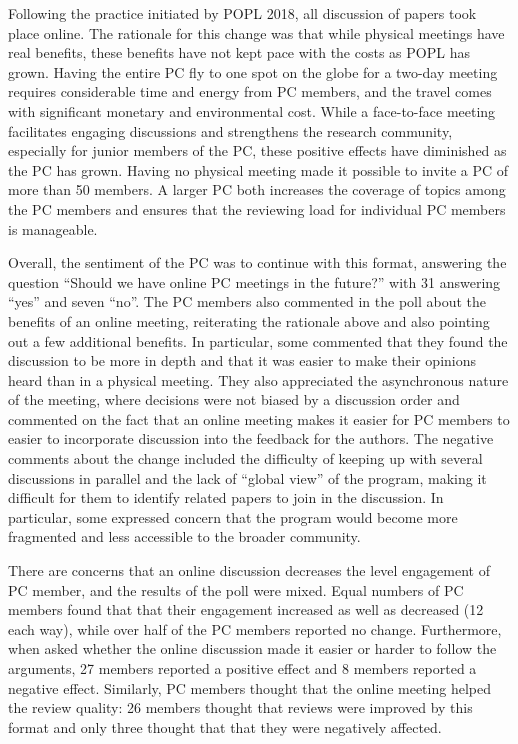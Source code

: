 Following the practice initiated by POPL 2018, all discussion of papers took
place online. The rationale for this change was that while physical meetings
have real benefits, these benefits have not kept pace with the costs as POPL
has grown.  Having the entire PC fly to one spot on the globe for a two-day
meeting requires considerable time and energy from PC members, and the travel
comes with significant monetary and environmental cost.  While a face-to-face
meeting facilitates engaging discussions and strengthens the research
community, especially for junior members of the PC, these positive effects
have diminished as the PC has grown. Having no physical meeting made it
possible to invite a PC of more than 50 members. A larger PC both increases
the coverage of topics among the PC members and ensures that the reviewing
load for individual PC members is manageable.

Overall, the sentiment of the PC was to continue with this format, answering
the question ``Should we have online PC meetings in the future?'' with 31
answering ``yes'' and seven ``no''.  The PC members also commented in the poll
about the benefits of an online meeting, reiterating the rationale above and
also pointing out a few additional benefits. In particular, some commented
that they found the discussion to be more in depth and that it was easier to
make their opinions heard than in a physical meeting. They also appreciated
the asynchronous nature of the meeting, where decisions were not biased by a
discussion order and commented on the fact that an online meeting makes it
easier for PC members to easier to incorporate discussion into the feedback
for the authors.  The negative comments about the change included the
difficulty of keeping up with several discussions in parallel and the lack of
``global view'' of the program, making it difficult for them to identify
related papers to join in the discussion. In particular, some expressed
concern that the program would become more fragmented and less accessible to
the broader community.

There are concerns that an online discussion decreases the level engagement of
PC member, and the results of the poll were mixed. Equal numbers of PC members
found that that their engagement increased as well as decreased (12 each way),
while over half of the PC members reported no change. Furthermore, when asked
whether the online discussion made it easier or harder to follow the
arguments, 27 members reported a positive effect and 8 members reported a
negative effect.  Similarly, PC members thought that the online meeting helped
the review quality: 26 members thought that reviews were improved by this
format and only three thought that that they were negatively affected.

